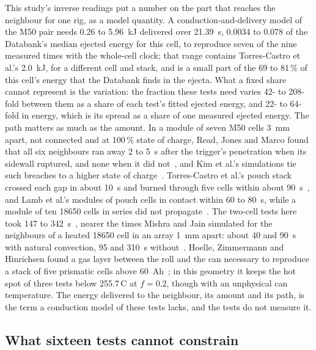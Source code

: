 \documentclass[preprint,12pt]{elsarticle}
\newcommand{\degC}{\,\textdegree C}
\begin{document}
This study's inverse readings put a number on the part that reaches the neighbour for one rig, as a model quantity. A conduction-and-delivery model of the M50 pair needs 0.26 to 5.96~kJ delivered over 21.39~s, 0.0034 to 0.078 of the Databank's median ejected energy for this cell, to reproduce seven of the nine measured times with the whole-cell clock; that range contains Torres-Castro et al.'s 2.0~kJ, for a different cell and stack, and is a small part of the 69 to 81\,\% of this cell's energy that the Databank finds in the ejecta. What a fixed share cannot represent is the variation: the fraction these tests need varies 42- to 208-fold between them as a share of each test's fitted ejected energy, and 22- to 64-fold in energy, which is its spread as a share of one measured ejected energy. The path matters as much as the amount. In a module of seven M50 cells 3~mm apart, not connected and at 100\,\% state of charge, Read, Jones and Marco found that all six neighbours ran away 2 to 5~s after the trigger's penetration when its sidewall ruptured, and none when it did not~\cite{read2024sidewall}, and Kim et al.'s simulations tie such breaches to a higher state of charge~\cite{kim2021venting}. Torres-Castro et al.'s pouch stack crossed each gap in about 10~s and burned through five cells within about 90~s~\cite{torrescastro2020passive}, and Lamb et al.'s modules of pouch cells in contact within 60 to 80~s, while a module of ten 18650 cells in series did not propagate~\cite{lamb2015failure}. The two-cell tests here took 147 to 342~s~\cite{fransson2024exploring}, nearer the times Mishra and Jain simulated for the neighbours of a heated 18650 cell in an array 1~mm apart: about 40 and 90~s with natural convection, 95 and 310~s without~\cite{mishra2021multimode}. Hoelle, Zimmermann and Hinrichsen found a gas layer between the roll and the can necessary to reproduce a stack of five prismatic cells above 60~Ah~\cite{hoelle2023simulation}; in this geometry it keeps the hot spot of three tests below 255.7\degC{} at $f=0.2$, though with an unphysical can temperature. The energy delivered to the neighbour, its amount and its path, is the term a conduction model of these tests lacks, and the tests do not measure it.

\subsection{What sixteen tests cannot constrain}
\label{sec:disc-tests}
\end{document}
